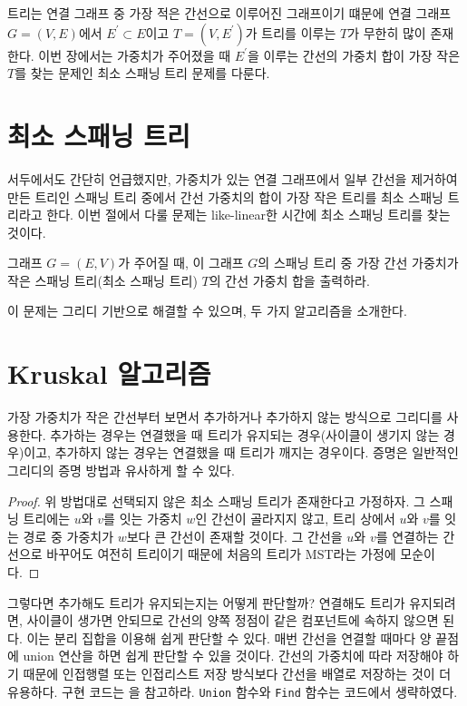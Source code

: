 트리는 연결 그래프 중 가장 적은 간선으로 이루어진 그래프이기 떄문에 연결 그래프 $G=(V, E)$에서 $E^\prime \subset E$이고 $T=(V, E^\prime)$가 트리를 이루는 $T$가 무한히 많이 존재한다. 이번 장에서는 가중치가 주어졌을 때 $E^\prime$을 이루는 간선의 가중치 합이 가장 작은 $T$를 찾는 문제인 최소 스패닝 트리 문제를 다룬다.

\section{최소 스패닝 트리}
서두에서도 간단히 언급했지만, 가중치가 있는 연결 그래프에서 일부 간선을 제거하여 만든 트리인 스패닝 트리 중에서 간선 가중치의 합이 가장 작은 트리를 최소 스패닝 트리라고 한다. 이번 절에서 다룰 문제는 like-linear한 시간에 최소 스패닝 트리를 찾는 것이다.

\begin{example}
    그래프 $G = (E, V)$가 주어질 때, 이 그래프 $G$의 스패닝 트리 중 가장 간선 가중치가 작은 스패닝 트리(최소 스패닝 트리) $T$의 간선 가중치 합을 출력하라.
\end{example}

이 문제는 그리디 기반으로 해결할 수 있으며, 두 가지 알고리즘을 소개한다.

\section{Kruskal 알고리즘}
가장 가중치가 작은 간선부터 보면서 추가하거나 추가하지 않는 방식으로 그리디를 사용한다. 추가하는 경우는 연결했을 때 트리가 유지되는 경우(사이클이 생기지 않는 경우)이고, 추가하지 않는 경우는 연결했을 때 트리가 깨지는 경우이다. 증명은 일반적인 그리디의 증명 방법과 유사하게 할 수 있다.

\begin{proof}
    위 방법대로 선택되지 않은 최소 스패닝 트리가 존재한다고 가정하자. 그 스패닝 트리에는 $u$와 $v$를 잇는 가중치 $w$인 간선이 골라지지 않고, 트리 상에서 $u$와 $v$를 잇는 경로 중 가중치가 $w$보다 큰 간선이 존재할 것이다. 그 간선을 $u$와 $v$를 연결하는 간선으로 바꾸어도 여전히 트리이기 때문에 처음의 트리가 MST라는 가정에 모순이다.
\end{proof}

그렇다면 추가해도 트리가 유지되는지는 어떻게 판단할까? 연결해도 트리가 유지되려면, 사이클이 생가면 안되므로 간선의 양쪽 정점이 같은 컴포넌트에 속하지 않으면 된다. 이는 분리 집합을 이용해 쉽게 판단할 수 있다. 매번 간선을 연결할 때마다 양 끝점에 union 연산을 하면 쉽게 판단할 수 있을 것이다.
간선의 가중치에 따라 저장해야 하기 때문에 인접행렬 또는 인접리스트 저장 방식보다 간선을 배열로 저장하는 것이 더 유용하다. 구현 코드는 을 참고하라. \texttt{Union} 함수와 \texttt{Find} 함수는 코드에서 생략하였다.

